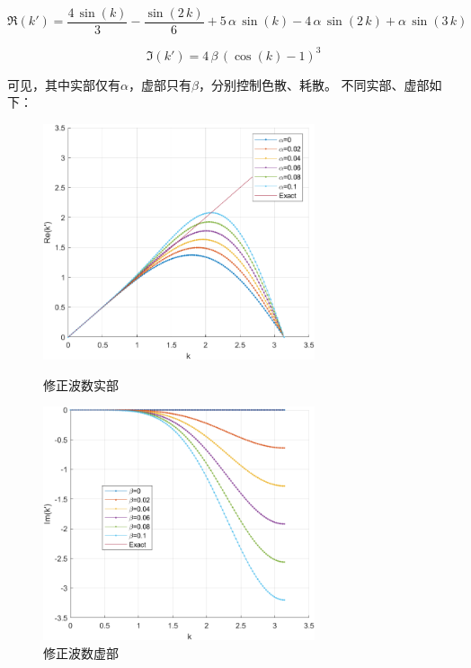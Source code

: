 \documentclass[UTF8,zihao=5]{ctexart} %
\begin{document}
$$
    \Re(k')=
    \frac{4\,\sin\left(k\right)}{3}-\frac{\sin\left(2\,k\right)}{6}+5\,\alpha \,\sin\left(k\right)-4\,\alpha \,\sin\left(2\,k\right)+\alpha \,\sin\left(3\,k\right)
$$

$$
    \Im(k')=
    4\,\beta \,{\left(\cos\left(k\right)-1\right)}^3
$$

可见，其中实部仅有$\alpha$，虚部只有$\beta$，分别控制色散、耗散。
不同实部、虚部如下：

\begin{figure}[H]
    \begin{minipage}[c]{0.45\linewidth}  %
        \centering
        \includegraphics[width=8cm]{RE.png}  %
        \caption{修正波数实部}
        \label{fig:a}
    \end{minipage}
    \hfill %
    \begin{minipage}[c]{0.45\linewidth}  %
        \centering
        \includegraphics[width=8cm]{IM.png}  %
        \caption{修正波数虚部}
        \label{fig:b}
    \end{minipage}
\end{figure}

\subsection{}
\end{document}
